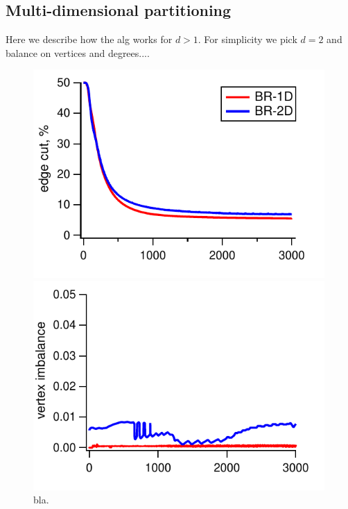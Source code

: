 \subsection{Multi-dimensional partitioning}
\label{sec:multi-exp}

Here we describe how the alg works for $d>1$. For simplicity we pick $d=2$ and balance on vertices and degrees....

\begin{figure}[!h]
	\begin{minipage}[b]{0.33\textwidth}
		\centering
		\includegraphics[width=0.99\textwidth]{pics/2da}
		\caption{bla.}
		\label{fig:2da}
	\end{minipage}
	\begin{minipage}[b]{0.33\textwidth}
		\centering
		\includegraphics[width=0.99\textwidth]{pics/2db}

\end{minipage}
\end{figure}
